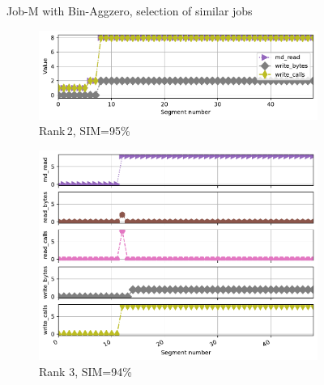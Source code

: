\documentclass{jhps}
\begin{document}
\begin{figure}[bt]
\caption{Job-M with Bin-Aggzero, selection of similar jobs}%
\label{fig:job-M-bin-aggzero}
\end{figure}



\begin{figure}[bt]
\begin{subfigure}{0.3\textwidth}
\centering
\vspace*{-2cm}
\includegraphics[width=\textwidth]{job_similarities_5024292-out/hex_lev-0.9546--1timeseries7826634}
\caption{Rank\,2, SIM=95\%}
\end{subfigure}
\begin{subfigure}{0.3\textwidth}
\centering
\includegraphics[width=\textwidth]{job_similarities_5024292-out/hex_lev-0.9365--2timeseries5240733}
\caption{Rank 3, SIM=94\%}
\end{subfigure}
\begin{subfigure}{0.3\textwidth}

\end{subfigure}
\end{figure}
\end{document}
